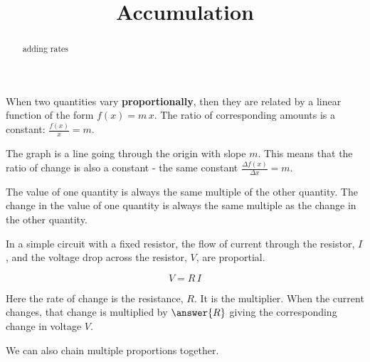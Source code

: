 \documentclass{ximera}
\title{Accumulation}
\begin{document}
\begin{abstract}
adding rates
\end{abstract}
\maketitle



When two quantities vary \textbf{proportionally}, then they are related by a linear function of the form $f(x) = m \, x$.  The ratio of corresponding amounts is a constant: $\frac{f(x)}{x} = m$.   

The graph is a line going through the origin with slope $m$.  This means that the ratio of change is also a constant - the same constant $\frac{\Delta f(x)}{\Delta x} = m$. 

The value of one quantity is always the same multiple of the other quantity. The change in the value of one quantity is always the same multiple as the change in the other quantity.




\begin{example}
In a simple circuit with a fixed resistor, the flow of current through the resistor, $I$, and the voltage drop across the resistor, $V$, are proportial.

\[   V = R \, I  \]

Here the rate of change is the resistance, $R$.  It is the multiplier.   When the current changes, that change is multiplied by $\answer{R}$ giving the corresponding change in voltage $V$.


\end{example}







We can also chain multiple proportions together.
\end{document}
